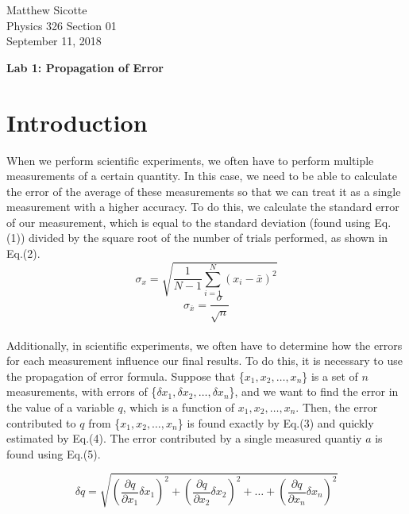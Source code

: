 \documentclass[leqno]{article}
\begin{document}
\begin{flushright}
Matthew Sicotte\\
Physics 326 Section 01\\
September 11, 2018
\end{flushright}
\begin{center}
	{\large \bf Lab 1: Propagation of Error}
\end{center}
\section*{Introduction}
When we perform scientific experiments, we often have to perform multiple measurements of a certain quantity.  In this case, we need to be able to calculate the error of the average of these measurements so that we can treat it as a single measurement with a higher accuracy.  To do this, we calculate the standard error of our measurement, which is equal to the standard deviation (found using Eq.(1)) divided by the square root of the number of trials performed, as shown in Eq.(2).  
\begin{equation}
	\sigma_x=\sqrt{\frac{1}{N-1}\sum_{i=1}^{N} (x_i-\bar{x})^2}
\end{equation}
\begin{equation}
	\sigma_{\bar{x}}=\frac{\sigma}{\sqrt{n}}
\end{equation}\\

Additionally, in scientific experiments, we often have to determine how the errors for each measurement influence our final results.  To do this, it is necessary to use the propagation of error formula.  Suppose that \{$x_1, x_2, \ldots, x_n$\} is a set of $n$ measurements, with errors of \{$\delta x_1, \delta x_2, \ldots, \delta x_n$\}, and we want to find the error in the value of a variable $q$, which is a function of $x_1, x_2, \ldots, x_n$.  Then, the error contributed to $q$ from \{$x_1, x_2, \ldots, x_n$\} is found exactly by Eq.(3) and quickly estimated by Eq.(4).  The error contributed by a single measured quantiy $a$ is found using Eq.(5). 


\begin{equation}
	\delta q=\sqrt{(\frac{\partial q}{\partial x_1}\delta x_1)^2+(\frac{\partial q}{\partial x_2}\delta x_2)^2+\ldots+(\frac{\partial q}{\partial x_n}\delta x_n)^2}
\end{equation}
\end{document}
